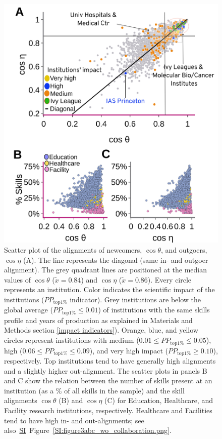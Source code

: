 \documentclass[draft,final]{vutinfth} %
\begin{document}
\begin{figure} [!b] %
  \centering
  \includegraphics[width=0.7\linewidth]{figures_alignment/figure3abc.png}
  \caption{Scatter plot of the alignments of newcomers, $\cos{\theta}$, and outgoers, $\cos{\eta}$ (A). The line represents the diagonal (same in- and outgoer alignment). %
  The grey quadrant lines are positioned at the median values of $\cos{\theta}$ ($\tilde{x}=0.84$) and $\cos{\eta}$ ($\tilde{x}=0.86$). Every circle represents an institution. Color indicates the scientific impact of the institutions (${ PP }_\mathrm{top1\%}$ indicator). Grey institutions are below the global average (${ PP }_\mathrm{top1\%}\leq{0.01}$) of institutions with the same skills profile and years of production as explained in Materials and Methods section \ref{impact indicators}). Orange, blue, and yellow circles represent institutions with medium ($0.01\leq{ PP }_\mathrm{top1\%}\leq{0.05}$), high ($0.06\leq{ PP }_\mathrm{top1\%}\leq{0.09}$), and very high impact (${ PP }_\mathrm{top1\%}\geq{0.10}$), respectively. Top institutions tend to have generally high alignments and a slightly higher out-alignment. The scatter plots in panels B and C show the relation between the number of skills present at an institution (as a \% of all skills in the sample) and the skill alignments $\cos{\theta}$ (B) and $\cos{\eta}$ (C) for Education, Healthcare, and Facility research institutions, respectively. Healthcare and Facilities tend to have high in- and out-alignments; see also~\hyperref[SI]{SI}~Figure~\ref{SI:figure3abc_wo_collaboration.png}.}
  \label{fig3:figure3abc.png}
\end{figure}
\end{document}
